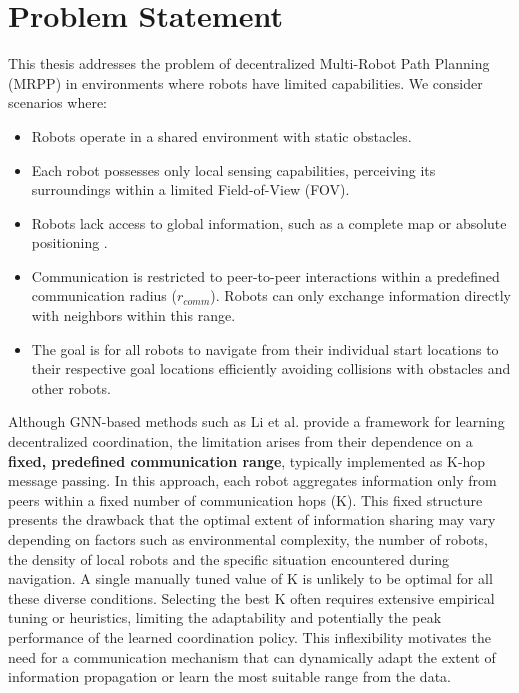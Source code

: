 \section{Problem Statement}
\label{sec:problem_statement}

This thesis addresses the problem of decentralized Multi-Robot Path Planning (MRPP) in environments where robots have limited capabilities. We consider scenarios where:
\begin{itemize}
    \item Robots operate in a shared environment with static obstacles.
    \item Each robot possesses only local sensing capabilities, perceiving its surroundings within a limited Field-of-View (FOV).
    \item Robots lack access to global information, such as a complete map or absolute positioning .
    \item Communication is restricted to peer-to-peer interactions within a predefined communication radius ($r_{comm}$). Robots can only exchange information directly with neighbors within this range.
    \item The goal is for all robots to navigate from their individual start locations to their respective goal locations efficiently avoiding collisions with obstacles and other robots.
\end{itemize}

Although GNN-based methods such as Li et al. \cite{Li2021GNNCoordination} provide a framework for learning decentralized coordination, the limitation arises from their dependence on a \textbf{fixed, predefined communication range}, typically implemented as K-hop message passing. In this approach, each robot aggregates information only from peers within a fixed number of communication hops (K). This fixed structure presents the drawback that the optimal extent of information sharing may vary depending on factors such as environmental complexity, the number of robots, the density of local robots and the specific situation encountered during navigation. A single manually tuned value of K is unlikely to be optimal for all these diverse conditions. Selecting the best K often requires extensive empirical tuning or heuristics, limiting the adaptability and potentially the peak performance of the learned coordination policy. This inflexibility motivates the need for a communication mechanism that can dynamically adapt the extent of information propagation or learn the most suitable range from the data.

